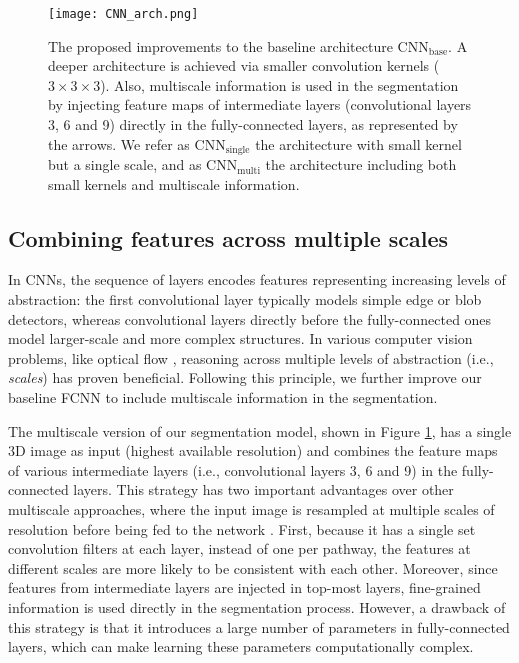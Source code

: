 \documentclass[twoside,fleqn,espcrc2]{elsarticle}
\newcommand{\CNNbase}{\mr{CNN}_\mr{base}}
\newcommand{\CNNsingle}{\mr{CNN}_\mr{single}}
\newcommand{\CNNmulti}{\mr{CNN}_\mr{multi}}
\newcommand{\mr}[1]{\mathrm{#1}}
\newcommand{\vold}[1]{$#1\!\times\!#1\!\times\!#1$}
\begin{document}
\begin{figure}[h!]
     \begin{center} 

        \texttt{[image: CNN\_arch.png]}
\caption{The proposed improvements to the baseline architecture $\CNNbase$. A deeper architecture is achieved via smaller convolution kernels (\vold{3}). Also, multiscale information is used in the segmentation by injecting feature maps of intermediate layers (convolutional layers 3, 6 and 9) directly in the fully-connected layers, as represented by the arrows. We refer as $\CNNsingle$ the architecture with small kernel but a single scale, and as $\CNNmulti$ the architecture including both small kernels and multiscale information.}
 \label{fig:CNN_archit}
\end{center}        
\end{figure}


\subsection{Combining features across multiple scales} 
\label{ssec:combiningFeatures}


In CNNs, the sequence of layers encodes features representing increasing levels of abstraction: the first convolutional layer typically models simple edge or blob detectors, whereas convolutional layers directly before the fully-connected ones model larger-scale and more complex structures. In various computer vision problems, like optical flow \cite{brox2004high}, reasoning across multiple levels of abstraction (i.e., \emph{scales}) has proven beneficial. Following this principle, we further improve our baseline FCNN to include multiscale information in the segmentation.

The multiscale version of our segmentation model, shown in Figure \ref{fig:CNN_archit}, has a single 3D image as input (highest available resolution) and combines the feature maps of various intermediate layers (i.e., convolutional layers 3, 6 and 9) in the fully-connected layers. This strategy \cite{farabet2013learning,chen2014semantic,chen2015semantic,hariharan2015hypercolumns} has two important advantages over other multiscale approaches, where the input image is resampled at multiple scales of resolution before being fed to the network \cite{kamnitsas2016efficient}. First, because it has a single set convolution filters at each layer, instead of one per pathway, the features at different scales are more likely to be consistent with each other. Moreover, since features from intermediate layers are injected in top-most layers, fine-grained information is used directly in the segmentation process. However, a drawback of this strategy is that it introduces a large number of parameters in fully-connected layers, which can make learning these parameters computationally complex.
\end{document}
